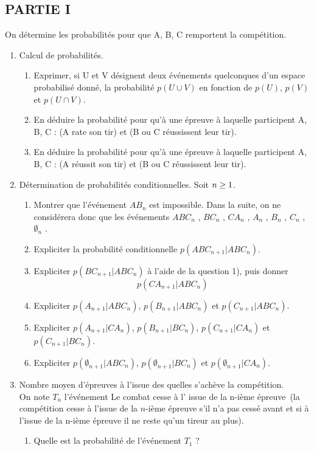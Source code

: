 \subsection*{PARTIE I}
On détermine les probabilités pour que A, B, C remportent la compétition.
\begin{enumerate}
\item Calcul de probabilités.
\begin{enumerate}
\item  Exprimer, si U et V désignent deux événements quelconques d'un espace probabilisé donné, la probabilité $ p(U \cup V)$ en fonction de $p(U)$, $p(V)$ et $p(U \cap V)$.
 \item En déduire la probabilité pour qu'à une épreuve à laquelle participent A, B, C :
(A rate son tir) et (B ou C réussissent leur tir).
\item En déduire la probabilité pour qu'à une épreuve à laquelle participent A, B, C :
(A réussit son tir) et (B ou C réussissent leur tir).
\end{enumerate}

\item Détermination de probabilités conditionnelles. Soit $n\geq 1$.
\begin{enumerate}
\item Montrer que l'événement $AB_n$ est impossible. Dans la suite, on ne considérera donc que les événements $ABC_n$ , $BC_n$ , $CA_n$ , $A_n$ , $B_n$ , $C_n$ , $\emptyset_n$ .
\item Expliciter la probabilité conditionnelle $p(ABC_{n+1}|ABC_n)$.
\item Expliciter $p(BC_{n+1}|ABC_n)$ à l'aide de la question 1), puis donner
\begin{displaymath}
  p(CA_{n+1}|ABC_n)
\end{displaymath}

\item Expliciter $p(A_{n+1}|ABC_n)$, $p(B_{n+1}|ABC_n)$ et $p(C_{n+1}|ABC_n)$.
\item Expliciter $p(A_{n+1}|CA_n)$, $p(B_{n+1}|BC_n)$, $p(C_{n+1}|CA_{n})$ et $p(C_{n+1}|BC_n)$.
\item Expliciter $p(\emptyset_{n+1}|ABC_n)$, $p(\emptyset_{n+1}|BC_n)$ et $p(\emptyset_{n+1}|CA_n)$.
\end{enumerate} 

\item Nombre moyen d'épreuves à l'issue des quelles s'achève la compétition.\\
On note $T_n$ l'événement  \og Le combat cesse à l' issue de la n-ième épreuve\fg ~(la compétition  cesse à l'issue de la $n$-ième épreuve s'il n'a pas cessé avant et si à l'issue de la n-ième épreuve  il ne reste qu'un tireur au plus).
\begin{enumerate}
\item Quelle est la probabilité de l'événement $T _1$ ?


\end{enumerate}
\end{enumerate}
